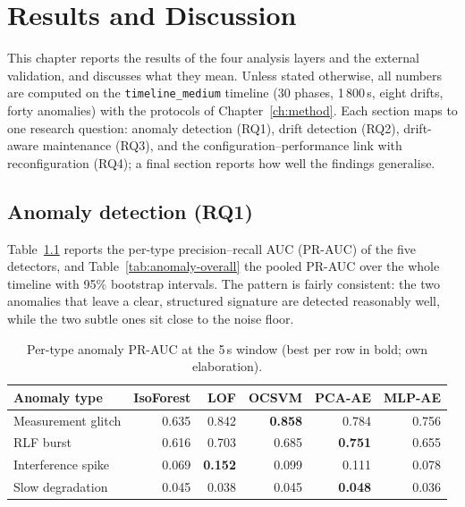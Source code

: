 
\chapter{Results and Discussion}
\label{ch:results}

This chapter reports the results of the four analysis layers and the external
validation, and discusses what they mean. Unless stated otherwise, all numbers
are computed on the \texttt{timeline\_medium} timeline (30 phases, 1\,800\,s,
eight drifts, forty anomalies) with the protocols of
Chapter~\ref{ch:method}. Each section maps to one research question:
anomaly detection (RQ1), drift detection (RQ2), drift-aware maintenance (RQ3),
and the configuration--performance link with reconfiguration (RQ4); a final
section reports how well the findings generalise.

\section{Anomaly detection (RQ1)}
\label{sec:res-anomaly}

Table~\ref{tab:anomaly-type} reports the per-type precision--recall AUC (PR-AUC)
of the five detectors, and Table~\ref{tab:anomaly-overall} the pooled PR-AUC over
the whole timeline with 95\% bootstrap intervals. The pattern is fairly
consistent: the two anomalies that leave a clear, structured signature are
detected reasonably well, while the two subtle ones sit close to the noise floor.

\begin{table}[ht]
\centering
\caption{Per-type anomaly PR-AUC at the 5\,s window (best per row in bold; own elaboration).}
\label{tab:anomaly-type}
\begin{tabular}{@{}lrrrrr@{}}
\toprule
Anomaly type & IsoForest & LOF & OCSVM & PCA-AE & MLP-AE \\
\midrule
Measurement glitch  & 0.635 & 0.842 & \textbf{0.858} & 0.784 & 0.756 \\
RLF burst           & 0.616 & 0.703 & 0.685 & \textbf{0.751} & 0.655 \\
Interference spike  & 0.069 & \textbf{0.152} & 0.099 & 0.111 & 0.078 \\
Slow degradation    & 0.045 & 0.038 & 0.045 & \textbf{0.048} & 0.036 \\
\bottomrule
\end{tabular}
\end{table}

